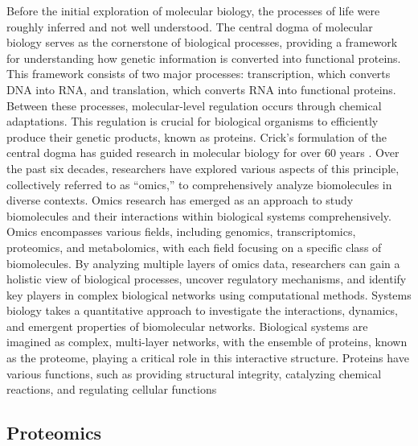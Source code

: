 \documentclass[
  11pt,
]{article}
\begin{document}
Before the initial exploration of molecular biology, the processes of
life were roughly inferred and not well understood. The central dogma of
molecular biology serves as the cornerstone of biological processes,
providing a framework for understanding how genetic information is
converted into functional proteins. This framework consists of two major
processes: transcription, which converts DNA into RNA, and translation,
which converts RNA into functional proteins. Between these processes,
molecular-level regulation occurs through chemical adaptations. This
regulation is crucial for biological organisms to efficiently produce
their genetic products, known as proteins. Crick's formulation of the
central dogma has guided research in molecular biology for over 60 years
\citep{Cobb2017}. Over the past six decades, researchers have explored
various aspects of this principle, collectively referred to as
``omics,'' to comprehensively analyze biomolecules in diverse contexts.
Omics research has emerged as an approach to study biomolecules and
their interactions within biological systems comprehensively. Omics
encompasses various fields, including genomics, transcriptomics,
proteomics, and metabolomics, with each field focusing on a specific
class of biomolecules. By analyzing multiple layers of omics data,
researchers can gain a holistic view of biological processes, uncover
regulatory mechanisms, and identify key players in complex biological
networks using computational methods. Systems biology takes a
quantitative approach to investigate the interactions, dynamics, and
emergent properties of biomolecular networks. Biological systems are
imagined as complex, multi-layer networks, with the ensemble of
proteins, known as the proteome, playing a critical role in this
interactive structure. Proteins have various functions, such as
providing structural integrity, catalyzing chemical reactions, and
regulating cellular functions \citep{Karahalil2016}

\hypertarget{proteomics}{%
\subsection{Proteomics}\label{proteomics}}
\end{document}
